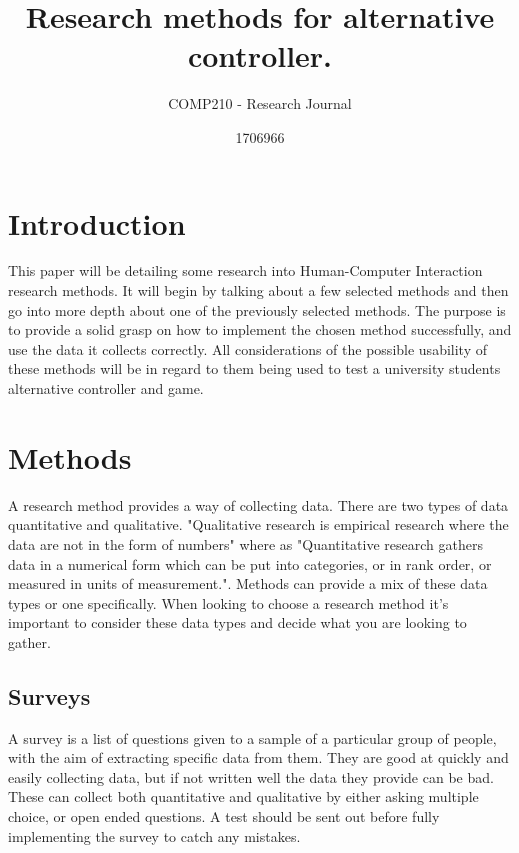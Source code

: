 \documentclass{scrartcl}
\title{Research methods for alternative controller.}
\subtitle{COMP210 - Research Journal}
\author{1706966}
\begin{document}
	
	\maketitle
	
	
	\section{Introduction}
		This paper will be detailing some research into Human-Computer Interaction research methods. It will begin by talking about a few selected methods and then go into more depth about one of the previously selected methods. The purpose is to provide a solid grasp on how to implement the chosen method successfully, and use the data it collects correctly. All considerations of the possible usability of these methods will be in regard to them being used to test a university students alternative controller and game.
		
	\section{Methods}
		A research method provides a way of collecting data. There are two types of data quantitative and qualitative. "Qualitative research is empirical research where the data are not in the form of numbers"\cite{punch2013introduction} where as "Quantitative research gathers data in a numerical form which can be put into categories, or in rank order, or measured in units of measurement."\cite{simplePsych1}. Methods can provide a mix of these data types or one specifically. When looking to choose a research method it's important to consider these data types and decide what you are looking to gather.

	\subsection{Surveys}
		A survey is a list of questions given to a sample of a particular group of people, with the aim of extracting specific data from them. They are good at quickly and easily collecting data, but if not written well the data they provide can be bad\cite{litwin1995measure}. These can collect both quantitative and qualitative by either asking multiple choice, or open ended questions. A test should be sent out before fully implementing the survey to catch any mistakes. 
		
\end{document}
